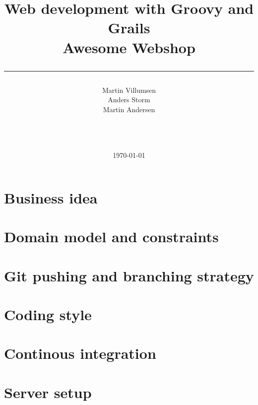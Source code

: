 \documentclass[a4paper,10pt]{article}
\title{Web development with Groovy and Grails\\ Awesome Webshop \\\rule{10cm}{0.5mm}}
\author{Martin Villumsen \\ Anders Storm \\Martin Andersen \\\rule{5.5cm}{0.5mm}\\}
\date{\today}
\begin{document}
\maketitle
\newpage

\tableofcontents
\newpage

\section{Business idea}
\section{Domain model and constraints}
\section{Git pushing and branching strategy}
\section{Coding style}
\section{Continous integration}
\section{Server setup}
\end{document}

